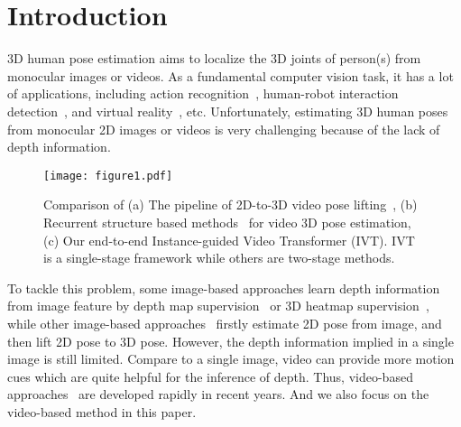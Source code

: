\documentclass[sigconf]{acmart}
\begin{document}



\maketitle

\section{Introduction}
3D human pose estimation aims to localize the 3D joints of person(s) from monocular images or videos. As a fundamental computer vision task, it has a lot of applications, including action recognition~\cite{liu2020disentangling}, human-robot interaction detection~\cite{li2020detailed}, and virtual reality~\cite{parger2021unoc}, etc. Unfortunately, estimating 3D human poses from monocular 2D images or videos is very challenging because of the lack of depth information.

\begin{figure}[!t]
\centering
\texttt{[image: figure1.pdf]}
\vspace{-0.5cm}

\caption{Comparison of (a) The pipeline of 2D-to-3D video pose lifting~\cite{cai2019exploiting,zheng20213d}, (b) Recurrent structure based methods~\cite{kocabas2020vibe,choi2021beyond} for video 3D pose estimation, (c) Our end-to-end Instance-guided Video Transformer (IVT). IVT is a single-stage framework while others are two-stage methods.}
\label{fig:fig1}
\end{figure}

To tackle this problem, some image-based approaches learn depth information from image feature by depth map supervision~\cite{wang2020hmor} or 3D heatmap supervision~\cite{moon2019camera,sun2021monocular}, while other image-based approaches~\cite{yang20183d,zeng2020srnet} firstly estimate 2D pose from image, and then lift 2D pose to 3D pose. However, the depth information implied in a single image is still limited. Compare to a single image, video can provide more motion cues which are quite helpful for the inference of depth. Thus, video-based approaches~\cite{sun2019human,arnab2019exploiting,cai2019exploiting,cheng20203d,choi2021beyond,zheng20213d} are developed rapidly in recent years. And we also focus on the video-based method in this paper.
\end{document}
